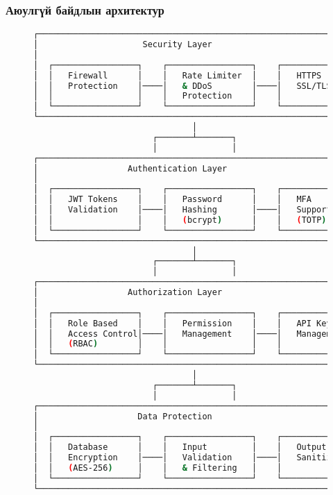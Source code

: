 \documentclass[main.tex]{subfiles}
\begin{document}
\subsubsection{Аюулгүй байдлын архитектур}

\begin{figure}[h]
\centering
\begin{lstlisting}[language=bash, caption=Системийн аюулгүй байдлын архитектур]
┌─────────────────────────────────────────────────────────────────┐
│                     Security Layer                              │
│                                                                 │
│  ┌─────────────────┐    ┌─────────────────┐    ┌─────────────┐  │
│  │   Firewall      │    │   Rate Limiter  │    │   HTTPS     │  │
│  │   Protection    │────│   & DDoS        │────│   SSL/TLS   │  │
│  │                 │    │   Protection    │    │             │  │
│  └─────────────────┘    └─────────────────┘    └─────────────┘  │
└─────────────────────────────────────────────────────────────────┘
                                │
                        ┌───────┴───────┐
                        │               │
┌─────────────────────────────────────────────────────────────────┐
│                  Authentication Layer                           │
│                                                                 │
│  ┌─────────────────┐    ┌─────────────────┐    ┌─────────────┐  │
│  │   JWT Tokens    │    │   Password      │    │   MFA       │  │
│  │   Validation    │────│   Hashing       │────│   Support   │  │
│  │                 │    │   (bcrypt)      │    │   (TOTP)    │  │
│  └─────────────────┘    └─────────────────┘    └─────────────┘  │
└─────────────────────────────────────────────────────────────────┘
                                │
                        ┌───────┴───────┐
                        │               │
┌─────────────────────────────────────────────────────────────────┐
│                  Authorization Layer                            │
│                                                                 │
│  ┌─────────────────┐    ┌─────────────────┐    ┌─────────────┐  │
│  │   Role Based    │    │   Permission    │    │   API Key   │  │
│  │   Access Control│────│   Management    │────│   Management│  │
│  │   (RBAC)        │    │                 │    │             │  │
│  └─────────────────┘    └─────────────────┘    └─────────────┘  │
└─────────────────────────────────────────────────────────────────┘
                                │
                        ┌───────┴───────┐
                        │               │
┌─────────────────────────────────────────────────────────────────┐
│                    Data Protection                              │
│                                                                 │
│  ┌─────────────────┐    ┌─────────────────┐    ┌─────────────┐  │
│  │   Database      │    │   Input         │    │   Output    │  │
│  │   Encryption    │────│   Validation    │────│   Sanitization│ │
│  │   (AES-256)     │    │   & Filtering   │    │             │  │
│  └─────────────────┘    └─────────────────┘    └─────────────┘  │
└─────────────────────────────────────────────────────────────────┘
\end{lstlisting}
\end{figure}
\end{document}
